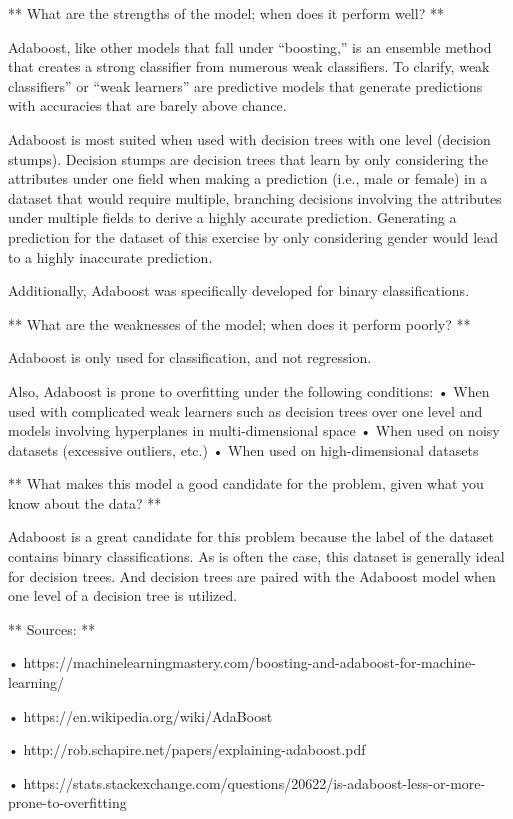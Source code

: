 \documentclass[11pt]{article}
\begin{document}
** What are the strengths of the model; when does it perform well? **

Adaboost, like other models that fall under ``boosting,'' is an ensemble
method that creates a strong classifier from numerous weak classifiers.
To clarify, weak classifiers'' or ``weak learners'' are predictive
models that generate predictions with accuracies that are barely above
chance.

Adaboost is most suited when used with decision trees with one level
(decision stumps). Decision stumps are decision trees that learn by only
considering the attributes under one field when making a prediction
(i.e., male or female) in a dataset that would require multiple,
branching decisions involving the attributes under multiple fields to
derive a highly accurate prediction. Generating a prediction for the
dataset of this exercise by only considering gender would lead to a
highly inaccurate prediction.

Additionally, Adaboost was specifically developed for binary
classifications.

** What are the weaknesses of the model; when does it perform poorly? **

Adaboost is only used for classification, and not regression.

Also, Adaboost is prone to overfitting under the following conditions: •
When used with complicated weak learners such as decision trees over one
level and models involving hyperplanes in multi-dimensional space • When
used on noisy datasets (excessive outliers, etc.) • When used on
high-dimensional datasets

** What makes this model a good candidate for the problem, given what
you know about the data? **

Adaboost is a great candidate for this problem because the label of the
dataset contains binary classifications. As is often the case, this
dataset is generally ideal for decision trees. And decision trees are
paired with the Adaboost model when one level of a decision tree is
utilized.

** Sources: **

•
https://machinelearningmastery.com/boosting-and-adaboost-for-machine-learning/

• https://en.wikipedia.org/wiki/AdaBoost

• http://rob.schapire.net/papers/explaining-adaboost.pdf

•
https://stats.stackexchange.com/questions/20622/is-adaboost-less-or-more-prone-to-overfitting
\end{document}
